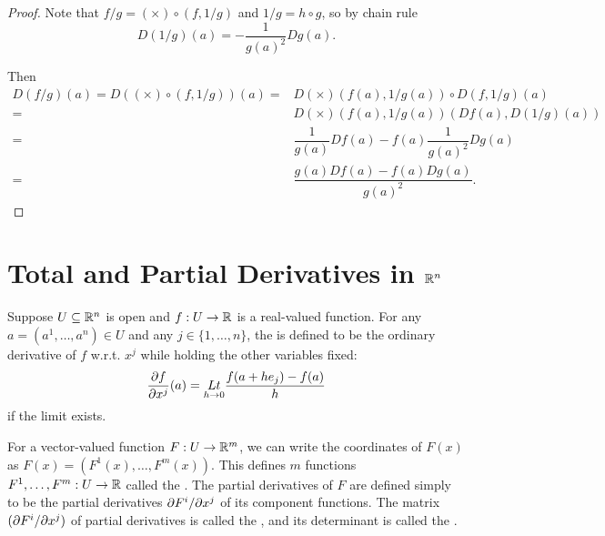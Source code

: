 \documentclass[11pt,a4paper]{article}
\begin{document}
\begin{proof}
 Note that $f/g = (\times)\circ (f,1/g)$ and $1/g = h\circ g$, so by chain rule 
\begin{equation*}
D(1/g)(a) = -\frac{1}{g(a)^2}Dg(a).    
\end{equation*}

Then 
\begin{align*}
D(f/g)(a) = D((\times)\circ (f,1/g))(a) =& D(\times)(f(a),1/g(a))\circ D(f,1/g)(a) \\
=& D(\times)(f(a),1/g(a))(Df(a),D(1/g)(a)) \\
=& \dfrac{1}{g(a)}Df(a)-f(a)\dfrac{1}{g(a)^2}Dg(a) \\
=& \dfrac{g(a)Df(a)-f(a)Dg(a)}{g(a)^2}.
\end{align*}
\end{proof}

\section{Total and Partial Derivatives in \texorpdfstring{$\mathbb{R}^n$}{Euclidean Spaces}}

\begin{definition}
Suppose $U\subseteq \mathbb{R}^n$ is open and $f:U\rightarrow \mathbb{R}$ is a real-valued function. For any $a = (a^1,\ldots,a^n)\in U$ and any $j\in\{1,\ldots,n\}$, the  is defined to be the ordinary derivative of $f$ w.r.t. $x^j$ while holding the other variables fixed:
\begin{equation*}
\dfrac{\partial f}{\partial x^{j}}(a) = \underset{h\rightarrow 0}{Lt} \dfrac{f(a+he_j)-f(a)}{h}
\end{equation*}
if the limit exists.
\end{definition}

\begin{definition}
For a vector-valued function $F:U\rightarrow \mathbb{R}^m$, we can write the coordinates of $F(x)$ as $F(x) = (F^1(x),\ldots,F^m(x))$. This defines $m$ functions $F^1,\ldots,F^m:U\rightarrow \mathbb{R}$ called the . The partial derivatives of $F$ are defined simply to be the partial derivatives $\partial F^i/\partial x^{j}$ of its component functions. The matrix $(\partial F^i/\partial x^{j})$ of partial derivatives is called the , and its determinant is called the .
\end{definition}
\end{document}
